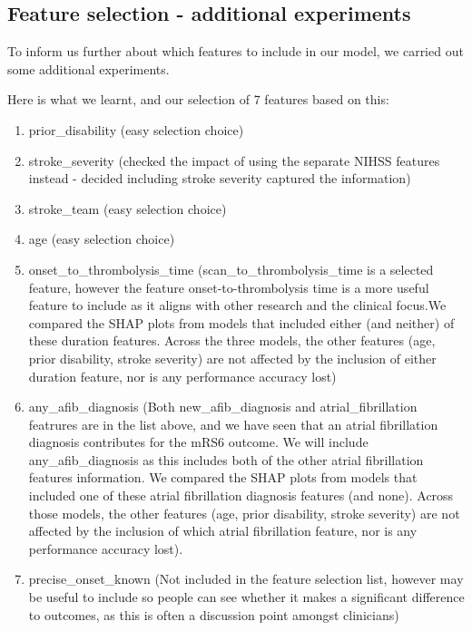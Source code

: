 \subsection{Feature selection - additional experiments}

To inform us further about which features to include in our model, we carried out some additional experiments. 

Here is what we learnt, and our selection of 7 features based on this:
\begin{enumerate}
    \item prior\_disability (easy selection choice)
    \item stroke\_severity (checked the impact of using the separate NIHSS features instead - decided including stroke severity captured the information)
    \item stroke\_team (easy selection choice)
    \item age (easy selection choice)
    \item onset\_to\_thrombolysis\_time (scan\_to\_thrombolysis\_time is a selected feature, however the feature onset-to-thrombolysis time is a more useful feature to include as it aligns with other research and the clinical focus.We compared the SHAP plots from models that included either (and neither) of these duration features. Across the three models, the other features (age, prior disability, stroke severity) are not affected by the inclusion of either duration feature, nor is any performance accuracy lost)
    \item any\_afib\_diagnosis (Both new\_afib\_diagnosis and atrial\_fibrillation featrures are in the list above, and we have seen that an atrial fibrillation diagnosis contributes for the mRS6 outcome. We will include any\_afib\_diagnosis as this includes both of the other atrial fibrillation features information. We compared the SHAP plots from models that included one of these atrial fibrillation diagnosis features (and none). Across those models, the other features (age, prior disability, stroke severity) are not affected by the inclusion of which atrial fibrillation feature, nor is any performance accuracy lost).
    \item precise\_onset\_known (Not included in the feature selection list, however may be useful to include so people can see whether it makes a significant difference to outcomes, as this is often a discussion point amongst clinicians)
\end{enumerate}

